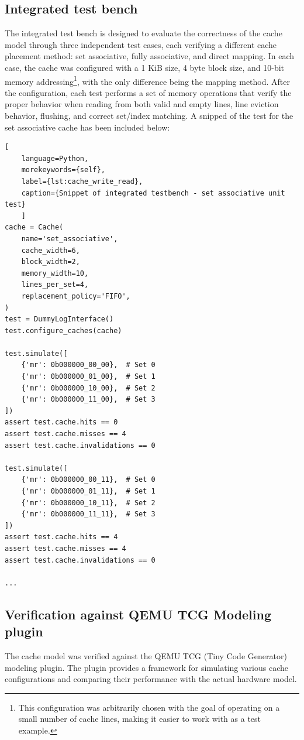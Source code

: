 \subsection{Integrated test bench}
The integrated test bench is designed to evaluate the correctness of the cache model through three independent test cases, each verifying a different cache placement method:
set associative, fully associative, and direct mapping. In each case, the cache was configured with a 1 KiB size, 4 byte block size, and 10-bit memory addressing\footnote{This
configuration was arbitrarily chosen with the goal of operating on a small number of cache lines, making it easier to work with as a test example.}, with the only difference
being the mapping method. After the configuration, each test performs a set of memory operations that verify the proper behavior when reading from both valid and empty lines, line
eviction behavior, flushing, and correct set/index matching. A snipped of the test for the set associative cache has been included below:

\begin{center}
\centering
\begin{minipage}{\linewidth}
\begin{lstlisting}[
    language=Python,
	morekeywords={self},
    label={lst:cache_write_read},
    caption={Snippet of integrated testbench - set associative unit test}
    ]
cache = Cache(
    name='set_associative',
    cache_width=6,
    block_width=2,
    memory_width=10,
    lines_per_set=4,
    replacement_policy='FIFO',
)
test = DummyLogInterface()
test.configure_caches(cache)

test.simulate([
    {'mr': 0b000000_00_00},  # Set 0
    {'mr': 0b000000_01_00},  # Set 1
    {'mr': 0b000000_10_00},  # Set 2
    {'mr': 0b000000_11_00},  # Set 3
])
assert test.cache.hits == 0
assert test.cache.misses == 4
assert test.cache.invalidations == 0

test.simulate([
    {'mr': 0b000000_00_11},  # Set 0
    {'mr': 0b000000_01_11},  # Set 1
    {'mr': 0b000000_10_11},  # Set 2
    {'mr': 0b000000_11_11},  # Set 3
])
assert test.cache.hits == 4
assert test.cache.misses == 4
assert test.cache.invalidations == 0

...
\end{lstlisting}
\end{minipage}
\end{center}

\subsection{Verification against QEMU TCG Modeling plugin}
The cache model was verified against the QEMU TCG (Tiny Code Generator) modeling plugin. The plugin provides a framework for simulating various cache configurations and comparing
their performance with the actual hardware model.

